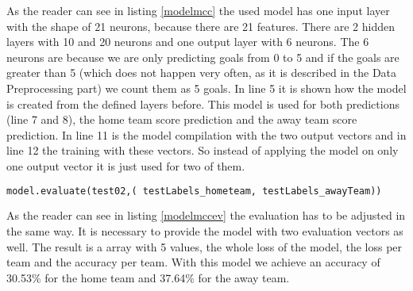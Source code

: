 As the reader can see in listing \ref{modelmcc} the used model has one input layer with the shape of 21 neurons, because there are 21 features. There are 2 hidden layers with 10 and 20 neurons and one output layer with 6 neurons. The 6 neurons are because we are only predicting goals from 0 to 5 and if the goals are greater than 5 (which does not happen very often, as it is described in the Data Preprocessing part) we count them as 5 goals. In line 5 it is shown how the model is created from the defined layers before. This model is used for both predictions (line 7 and 8), the home team score prediction and the away team score prediction. In line 11 is the model compilation with the two output vectors and in line 12 the training with these vectors. So instead of applying the model on only one output vector it is just used for two of them. 

\begin{lstlisting}[language=Python, caption=Python code for multi class classification model evaluation, label=modelmccev]
model.evaluate(test02,( testLabels_hometeam, testLabels_awayTeam))
\end{lstlisting}

As the reader can see in listing \ref{modelmccev} the evaluation has to be adjusted in the same way. It is necessary to provide the model with two evaluation vectors as well. The result is a array with 5 values, the whole loss of the model, the loss per team and the accuracy per team. With this model we achieve an accuracy of 30.53\% for the home team and 37.64\% for the away team. 

